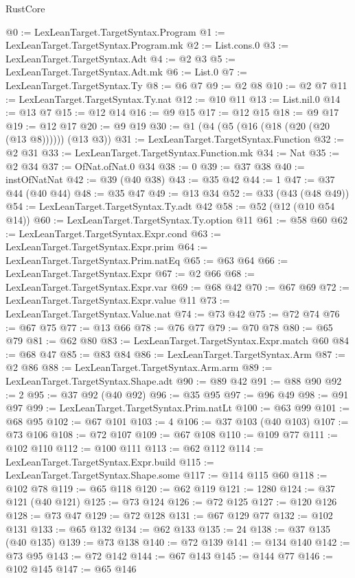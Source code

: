 \begin{lexlean}{RustCore}
\begin{coremodule}
@0 := LexLeanTarget.TargetSyntax.Program
@1 := LexLeanTarget.TargetSyntax.Program.mk
@2 := List.cons.{0}
@3 := LexLeanTarget.TargetSyntax.Adt
@4 := @2 @3
@5 := LexLeanTarget.TargetSyntax.Adt.mk
@6 := List.{0}
@7 := LexLeanTarget.TargetSyntax.Ty
@8 := @6 @7
@9 := @2 @8
@10 := @2 @7
@11 := LexLeanTarget.TargetSyntax.Ty.nat
@12 := @10 @11
@13 := List.nil.{0}
@14 := @13 @7
@15 := @12 @14
@16 := @9 @15
@17 := @12 @15
@18 := @9 @17
@19 := @12 @17
@20 := @9 @19
@30 := @1 (@4 (@5 (@16 (@18 (@20 (@20 (@13 @8)))))) (@13 @3))
@31 := LexLeanTarget.TargetSyntax.Function
@32 := @2 @31
@33 := LexLeanTarget.TargetSyntax.Function.mk
@34 := Nat
@35 := @2 @34
@37 := OfNat.ofNat.{0} @34
@38 := 0
@39 := @37 @38
@40 := instOfNatNat
@42 := @39 (@40 @38)
@43 := @35 @42
@44 := 1
@47 := @37 @44 (@40 @44)
@48 := @35 @47
@49 := @13 @34
@52 := @33 (@43 (@48 @49))
@54 := LexLeanTarget.TargetSyntax.Ty.adt @42
@58 := @52 (@12 (@10 @54 @14))
@60 := LexLeanTarget.TargetSyntax.Ty.option @11
@61 := @58 @60
@62 := LexLeanTarget.TargetSyntax.Expr.cond
@63 := LexLeanTarget.TargetSyntax.Expr.prim
@64 := LexLeanTarget.TargetSyntax.Prim.natEq
@65 := @63 @64
@66 := LexLeanTarget.TargetSyntax.Expr
@67 := @2 @66
@68 := LexLeanTarget.TargetSyntax.Expr.var
@69 := @68 @42
@70 := @67 @69
@72 := LexLeanTarget.TargetSyntax.Expr.value @11
@73 := LexLeanTarget.TargetSyntax.Value.nat
@74 := @73 @42
@75 := @72 @74
@76 := @67 @75
@77 := @13 @66
@78 := @76 @77
@79 := @70 @78
@80 := @65 @79
@81 := @62 @80
@83 := LexLeanTarget.TargetSyntax.Expr.match @60
@84 := @68 @47
@85 := @83 @84
@86 := LexLeanTarget.TargetSyntax.Arm
@87 := @2 @86
@88 := LexLeanTarget.TargetSyntax.Arm.arm
@89 := LexLeanTarget.TargetSyntax.Shape.adt
@90 := @89 @42
@91 := @88 @90
@92 := 2
@95 := @37 @92 (@40 @92)
@96 := @35 @95
@97 := @96 @49
@98 := @91 @97
@99 := LexLeanTarget.TargetSyntax.Prim.natLt
@100 := @63 @99
@101 := @68 @95
@102 := @67 @101
@103 := 4
@106 := @37 @103 (@40 @103)
@107 := @73 @106
@108 := @72 @107
@109 := @67 @108
@110 := @109 @77
@111 := @102 @110
@112 := @100 @111
@113 := @62 @112
@114 := LexLeanTarget.TargetSyntax.Expr.build
@115 := LexLeanTarget.TargetSyntax.Shape.some
@117 := @114 @115 @60
@118 := @102 @78
@119 := @65 @118
@120 := @62 @119
@121 := 1280
@124 := @37 @121 (@40 @121)
@125 := @73 @124
@126 := @72 @125
@127 := @120 @126
@128 := @73 @47
@129 := @72 @128
@131 := @67 @129 @77
@132 := @102 @131
@133 := @65 @132
@134 := @62 @133
@135 := 24
@138 := @37 @135 (@40 @135)
@139 := @73 @138
@140 := @72 @139
@141 := @134 @140
@142 := @73 @95
@143 := @72 @142
@144 := @67 @143
@145 := @144 @77
@146 := @102 @145
@147 := @65 @146

\end{coremodule}
\end{lexlean}
